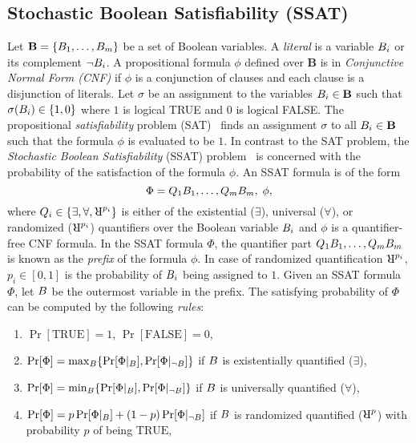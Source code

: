 \subsection{Stochastic Boolean Satisfiability (SSAT)}\label{fairness_justicia_sec:ssat}
Let $\mathbf{B}  = \{B_1, \dots, B_m\}  $ be a set of Boolean variables. A \textit{literal} is a variable $ B_i $ or its complement $ \neg B_i $. 
A propositional formula $\phi$ defined over $\mathbf{B}$ is in \textit{Conjunctive Normal Form (CNF)} if $\phi$   is  a conjunction of clauses and each clause is a disjunction of literals. 
Let $ \sigma $ be an assignment to the  variables $ B_i \in \mathbf{B} $  such that $ \sigma(B_i) \in \{1, 0\} $ where $ 1 $ is logical TRUE and $ 0 $ is logical FALSE. The propositional  \textit{satisfiability} problem (SAT)~\cite{biere2009handbook} finds an assignment $ \sigma $ to all $ B_i \in  \mathbf{B} $ such that the formula $ \phi $ is evaluated to be $1$. 
In contrast to the SAT problem, the \textit{Stochastic Boolean Satisfiability} (SSAT) problem~\cite{littman2001stochastic} is concerned with the  probability of the satisfaction of the formula $\phi$. 
An SSAT formula is of the form
\begin{equation}\label{fairness_justicia_eq:ssat}
\Phi = Q_1B_1, \dots, Q_m B_m,\; \phi, 
\end{equation}
where $ Q_i \in \{\exists, \forall, \R^{p_i}\} $ is either of the existential ($\exists$), universal ($\forall$), or randomized ($\R^{p_i}$) quantifiers over the Boolean variable $B_i$ and $\phi$ is a quantifier-free CNF formula. In the SSAT formula $ \Phi $, the quantifier part $ Q_1B_1, \dots, Q_m B_m $ is known as the \textit{prefix} of the formula $ \phi $. In case of randomized quantification $ \R^{p_i} $, $ p_i \in [0,1] $ is the probability of $ B_i $ being assigned to $ 1 $. Given an SSAT formula $ \Phi $, let $ B $ be the outermost variable in the prefix. The satisfying probability of $ \Phi $ can be computed by the following \textit{rules}:
\begin{enumerate}
	\item $ \Pr[\text{TRUE}] = 1 $,  $ \Pr[\text{FALSE}] = 0 $, 
	\item $ \Pr [\Phi] = \max_{B} \{\Pr[\Phi|_{B}], \Pr[\Phi|_{\neg B}]\}$ if $ B $ is existentially quantified ($ \exists $), 
	\item $ \Pr [\Phi] = \min_{B} \{\Pr[\Phi|_{B}], \Pr[\Phi|_{\neg B}]\} $ if $ B $ is universally quantified ($ \forall $), 
	\item $ \Pr [\Phi] = p\Pr[\Phi|_{B}] + (1-p) \Pr[\Phi|_{\neg B}] $ if $ B $ is randomized quantified ($\R^{p}$) with probability $p$ of being $\text{TRUE}$,
\end{enumerate}
